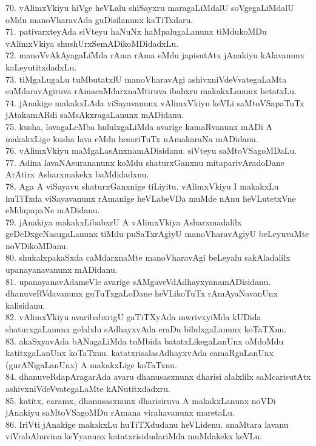 \documentclass{article}
\begin{document}
70. vAlimxVkiyu hiVge heVLalu shiSayxru maragaLiMdalU soVgegaLiMdalU oMdu manoVharavAda guDisilanunx kaTiTxdaru.\\
71. pativarxteyAda siVteyu haNuNx haMpalugaLanunx tiMdukoMDu vAlimxVkiya shushUrxSemADikoMDidadxLu.\\
72. manoVvAkAyagaLiMda rAma rAma eMdu japisutAtx jAnakiyu kAlavanunx kaLeyutitxdadxLu.\\
73. tiMgaLugaLu tuMbutatxlU manoVharavAgi ashivxniVdeVvategaLaMta suMdaravAgiruva rAmacaMdarxnaMtiruva ibabxru makakxLanunx hetatxLu.\\
74. jAnakige makakxLAda viSayavanunx vAlimxVkiyu keVLi saMtoVSapaTuTx jAtakamARdi saMsAkxragaLanunx mADidanu.\\
75. kusha, lavagaLeMba hululxgaLiMda avarige kamaRvanunx mADi A makakxLige kusha lava eMdu hesariTuTx nAmakaraNa mADidanu.\\
76. vAlimxVkiyu maMgaLasAnxnamADisidanu. siVteyu saMtoVSagoMDaLu.\\
77. Adina lavaNAsurananunx koMdu shaturxGanxnu mitaparivAradoDane ArAtirx Asharxmakekx baMdidadxnu.\\
78. Aga A viSayavu shaturxGanxnige tiLiyitu. vAlimxVkiyu I makakxLu huTiTxda viSayavanunx rAmanige heVLabeVDa muMde nAnu heVLutetxVne eMdapapxNe mADidanu.\\
79. jAnakiya makakxLibabxrU A vAlimxVkiya Asharxmadalilx geDeDxgeNasugaLanunx tiMdu puSaTxrAgiyU manoVharavAgiyU beLeyuvaMte noVDikoMDanu.\\
80. shukalxpakaSxda caMdarxnaMte manoVharavAgi beLeyalu sakAladalilx upanayanavanunx mADidanu.\\
81. upanayanavAdameVle avarige sAMgaveVdAdhayxyanamADisidanu. dhanuveRVdavanunx guTuTxgaLoDane heVLikoTuTx rAmAyaNavanUnx kalisidanu.\\
82. vAlimxVkiyu avaribabxrigU gaTiTXyAda mwrivxyiMda kUDida shaturxgaLanunx gelalxlu sAdhayxvAda eraDu bilulxgaLanunx koTaTXnu.\\
83. akaSxyavAda bANagaLiMda tuMbida batatxLikegaLanUnx oMdoMdu katitxgaLanUnx koTaTxnu. katatxrisalasAdhayxvAda camaRgaLanUnx (gurANigaLanUnx) A makakxLige koTaTxnu.\\
84. dhanuveRdapAragarAda avaru dhanusasxnunx dharisi alalxlilx saMcarisutAtx ashivxniVdeVvategaLaMte kANutitxdadxru.\\
85. katitx, caramx, dhanusasxnunx dharisiruva A makakxLanunx noVDi jAnakiyu saMtoVSagoMDu rAmana virahavanunx maretaLu.\\
86. IriVti jAnakige makakxLu huTiTXdudanu heVLidenu. anaMtara lavanu viVrabAhuvina keYyanunx katatxrisidudariMda muMdakekx keVLu.
\end{document}
